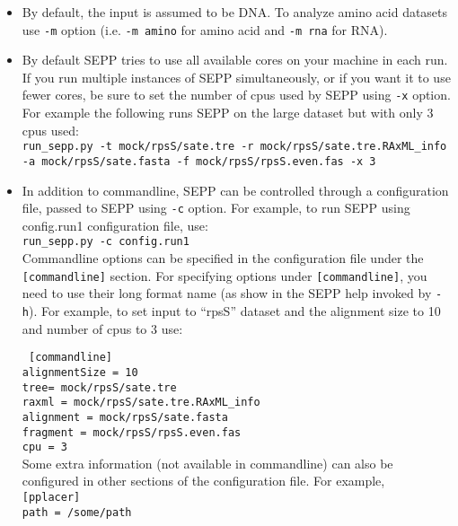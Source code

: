 \documentclass[11pt]{article} %
\newcommand{\sepp}{SEPP\xspace}
\newcommand{\ins}[1]{{\tt #1}}
\newcommand{\file}[1]{{\sf #1}}
\begin{document}
\begin{itemize}
\item By default, the input is assumed to be DNA. To analyze amino acid datasets use \ins{-m} option (i.e. \ins{-m amino} for amino acid and \ins{-m rna} for RNA).
\item By default \sepp tries to use all available cores on your machine in each run. If you run multiple instances of \sepp simultaneously, or if you want it to use fewer cores, be sure
to set the number of cpus used by \sepp using \ins{-x} option. For example the following runs \sepp on the large dataset but with only 3 cpus used:\\

\ins{run\_sepp.py -t mock/rpsS/sate.tre -r mock/rpsS/sate.tre.RAxML\_info \\ -a mock/rpsS/sate.fasta -f mock/rpsS/rpsS.even.fas -x 3}\\
\item In addition to commandline, \sepp can be 
controlled through a configuration file, passed to \sepp using \ins{-c} option. For example, to run \sepp using \file{config.run1} configuration file, use:\\

\ins{run\_sepp.py -c config.run1}\\

Commandline options can be specified in the configuration file under the \ins{[commandline]} section.
For specifying options under \ins{[commandline]}, you need to use their long format name (as show in the \sepp help invoked by \ins{-h}).
For example, to set input to ``rpsS'' dataset and the alignment size to 10 and number of cpus to 3 use:

\ins{
[commandline]\\
alignmentSize = 10 \\
tree= mock/rpsS/sate.tre \\
raxml = mock/rpsS/sate.tre.RAxML\_info \\ 
alignment = mock/rpsS/sate.fasta \\
fragment = mock/rpsS/rpsS.even.fas \\
cpu =  3}\\
 
Some extra information (not available in commandline) can also be configured in other sections of the configuration file. For example, \\

\ins{[pplacer]\\
path = /some/path\\
}


\end{itemize}
\end{document}
